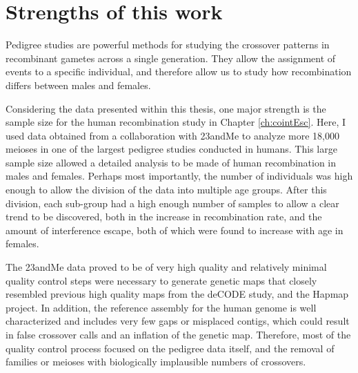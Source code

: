 

\section{Strengths of this work}
Pedigree studies are powerful methods for studying the crossover patterns in recombinant gametes across a single generation.
They allow the assignment of events to a specific individual, and therefore allow us to study how recombination differs between males and females.

Considering the data presented within this thesis, one major strength is the sample size for the human recombination study in Chapter \ref{ch:cointEsc}.
Here, I used data obtained from a collaboration with 23andMe to analyze more 18,000 meioses in one of the largest pedigree studies conducted in humans\cite{Campbell2015}.
This large sample size allowed a detailed analysis to be made of human recombination in males and females.
Perhaps most importantly, the number of individuals was high enough to allow the division of the data into multiple age groups.
After this division, each sub-group had a high enough number of samples to allow a clear trend to be discovered, both in the increase in recombination rate, and the amount of interference escape, both of which were found to increase with age in females.

The 23andMe data proved to be of very high quality and relatively minimal quality control steps were necessary to generate genetic maps that closely resembled previous high quality maps from the deCODE study\cite{Kong2010}, and the Hapmap project\cite{hapmap2007}.
In addition, the reference assembly for the human genome is well characterized and includes very few gaps or misplaced contigs, which could result in false crossover calls and an inflation of the genetic map.
Therefore, most of the quality control process focused on the pedigree data itself, and the removal of families or meioses with biologically implausible numbers of crossovers.

